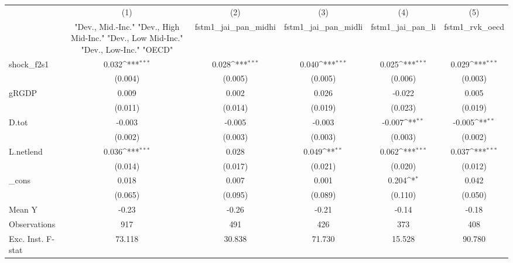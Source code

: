 {
\def\sym#1{\ifmmode^{#1}\else\(^{#1}\)\fi}
\begin{tabular}{l*{5}{c}}
\toprule
            &\multicolumn{1}{c}{(1)}&\multicolumn{1}{c}{(2)}&\multicolumn{1}{c}{(3)}&\multicolumn{1}{c}{(4)}&\multicolumn{1}{c}{(5)}\\
            &\multicolumn{1}{c}{ "Dev., Mid.-Inc." "Dev., High Mid-Inc." "Dev., Low Mid-Inc." "Dev., Low-Inc." "OECD" }&\multicolumn{1}{c}{fstm1\_jai\_pan\_midhi}&\multicolumn{1}{c}{fstm1\_jai\_pan\_midli}&\multicolumn{1}{c}{fstm1\_jai\_pan\_li}&\multicolumn{1}{c}{fstm1\_rvk\_oecd}\\
\midrule
shock\_f2s1  &       0.032\sym{***}&       0.028\sym{***}&       0.040\sym{***}&       0.025\sym{***}&       0.029\sym{***}\\
            &     (0.004)         &     (0.005)         &     (0.005)         &     (0.006)         &     (0.003)         \\
\addlinespace
gRGDP       &       0.009         &       0.002         &       0.026         &      -0.022         &       0.005         \\
            &     (0.011)         &     (0.014)         &     (0.019)         &     (0.023)         &     (0.019)         \\
\addlinespace
D.tot       &      -0.003         &      -0.005         &      -0.003         &      -0.007\sym{**} &      -0.005\sym{**} \\
            &     (0.002)         &     (0.003)         &     (0.003)         &     (0.003)         &     (0.002)         \\
\addlinespace
L.netlend   &       0.036\sym{***}&       0.028         &       0.049\sym{**} &       0.062\sym{***}&       0.037\sym{***}\\
            &     (0.014)         &     (0.017)         &     (0.021)         &     (0.020)         &     (0.012)         \\
\addlinespace
\_cons      &       0.018         &       0.007         &       0.001         &       0.204\sym{*}  &       0.042         \\
            &     (0.065)         &     (0.095)         &     (0.089)         &     (0.110)         &     (0.050)         \\
\midrule
Mean Y      &       -0.23         &       -0.26         &       -0.21         &       -0.14         &       -0.18         \\
Observations&         917         &         491         &         426         &         373         &         408         \\
Exc. Inst. F-stat&      73.118         &      30.838         &      71.730         &      15.528         &      90.780         \\
\bottomrule
\end{tabular}
}
